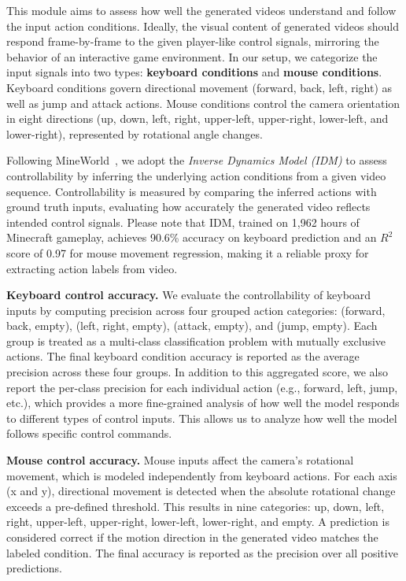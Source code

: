 \documentclass{article}
\begin{document}
This module aims to assess how well the generated videos understand and follow the input action conditions. Ideally, the visual content of generated videos should respond frame-by-frame to the given player-like control signals, mirroring the behavior of an interactive game environment. In our setup, we categorize the input signals into two types: \textbf{keyboard conditions} and \textbf{mouse conditions}. Keyboard conditions govern directional movement (forward, back, left, right) as well as jump and attack actions. Mouse conditions control the camera orientation in eight directions (up, down, left, right, upper-left, upper-right, lower-left, and lower-right), represented by rotational angle changes.

Following MineWorld~\cite{guo2025mineworld}, we adopt the \textit{Inverse Dynamics Model (IDM)} to assess controllability by inferring the underlying action conditions from a given video sequence. Controllability is measured by comparing the inferred actions with ground truth inputs, evaluating how accurately the generated video reflects intended control signals. Please note that IDM, trained on 1,962 hours of Minecraft gameplay, achieves 90.6\% accuracy on keyboard prediction and an $R^2$ score of 0.97 for mouse movement regression, making it a reliable proxy for extracting action labels from video.

\noindent\textbf{Keyboard control accuracy.} 
We evaluate the controllability of keyboard inputs by computing precision across four grouped action categories: (forward, back, empty), (left, right, empty), (attack, empty), and (jump, empty). Each group is treated as a multi-class classification problem with mutually exclusive actions. The final keyboard condition accuracy is reported as the average precision across these four groups. In addition to this aggregated score, we also report the per-class precision for each individual action (e.g., forward, left, jump, etc.), which provides a more fine-grained analysis of how well the model responds to different types of control inputs. This allows us to analyze how well the model follows specific control commands.

\noindent\textbf{Mouse control accuracy.} 
Mouse inputs affect the camera's rotational movement, which is modeled independently from keyboard actions. For each axis (x and y), directional movement is detected when the absolute rotational change exceeds a pre-defined threshold. This results in nine categories: up, down, left, right, upper-left, upper-right, lower-left, lower-right, and empty. A prediction is considered correct if the motion direction in the generated video matches the labeled condition. The final accuracy is reported as the precision over all positive predictions.
\end{document}
